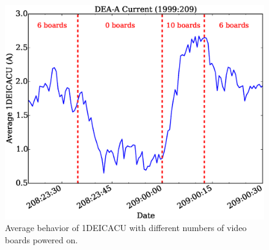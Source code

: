 \documentclass[11pt]{article}
\begin{document}
\begin{landscape}
\begin{figure}
\begin{center}
\includegraphics[width=1.2\textwidth]{deaa_on_test_vid_fig3.eps}
\caption{Average behavior of 1DEICACU with different numbers of video boards
powered on.}
\end{center}
\end{figure}
\end{landscape}


\newcommand{\tablecaptiontext}{TURN ON DEA A AND TEST VIDEO BOARDS}

\end{document}
